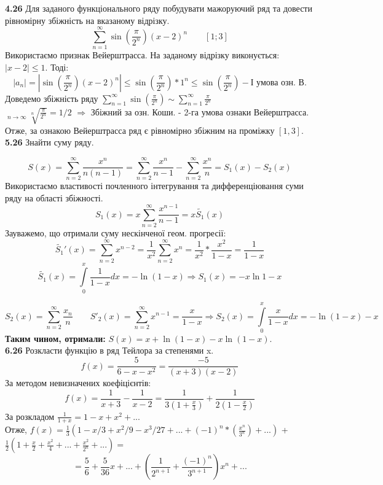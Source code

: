 \documentclass[14pt,a4paper]{scrartcl}
\theoremstyle{definition}
\theoremstyle{remark}
\theoremstyle{definition}
\theoremstyle{definition}
\DeclareMathOperator*\uplim{\overline{lim}}
\begin{document}
\textbf{4.26} Для заданого функціонального ряду побудувати мажоруючий ряд
та довести рівномірну збіжність на вказаному відрізку.\\
$$  \sum\limits_{ n = 1}^{ \infty}{\sin{( \frac{\pi}{2^n} )}(x-2)^n } \qquad [1;3]$$
Використаємо признак Вейерштрасса. На заданому відрізку виконується: $ \left| x-2  \right| \leq 1 $. Тоді:\\
$$
\left| a_n \right| = \left| \sin{( \frac{\pi}{2^n} )} (x-2)^n  \right| \leq   \sin{( \frac{\pi}{ 2^n} )} * 1^n \leq \sin{( \frac{\pi}{2^n} )} - \text{І умова озн. В.}
$$
Доведемо збіжність ряду $  \sum\limits_{n = 1}^{ \infty}{ \sin{( \frac{\pi}{2^n} )} } \sim  \sum\limits_{n = 1}^{ \infty}{ \frac{\pi}{2^n} }$ \\
$  \uplim\limits_{n\to  \infty}{ \sqrt[n]{ \frac{\pi}{2^n} }} =  1/2 $ $\Rightarrow$ Збіжний за озн. Коши. - 2-га умова ознаки Вейерштрасса.\\
Отже, за ознакою Вейерштрасса ряд є рівномірно збіжним на проміжку $[1,3]$. \\

\textbf{5.26} Знайти суму ряду.

$$
S(x) =  \sum\limits_{n = 2}^{ \infty}{ \frac{x^n}{ n(n-1)} } =  \sum\limits_{n = 2}^{ \infty}{ \frac{x^n}{n-1} -  \sum\limits_{n = 2}^{ \infty}{ \frac{x^n}{n} } } = S_1(x) - S_2(x)
$$
Використаємо властивості почленного інтегрування та дифференціювання суми ряду на області збіжності.
$$
S_1(x) = x  \sum\limits_{n = 2}^{ \infty}{  \frac{x^{n-1}}{n-1} } = x \tilde{S_1}(x)
$$
Зауважемо, що отримали суму нескінченої геом. прогресії:
$$
\tilde{S_1}'(x) =  \sum\limits_{n = 2}^{ \infty}{x^{n-2}} = \frac{1}{x^2}  \sum\limits_{n = 2}^{ \infty}{x^n} = \frac{1}{x^2} * \frac{x^2}{1-x} = \frac{1}{1-x}
$$
$$
\tilde{S_1}(x) =  \int\limits_{0}^{x}{ \frac{1}{1-x}dx } = - \ln{(1-x)} \Rightarrow S_1(x) = -x \ln{1-x}
$$

$$
S_2(x) =  \sum\limits_{n = 2}^{ \infty}{ \frac{x_n}{n} } \qquad S'_2(x) =  \sum\limits_{n = 2}^{ \infty}{x^{n-1} } = \frac{x}{1-x} \Rightarrow S_2(x) =  \int\limits_{0}^{x}{ \frac{x}{1-x}dx }  = - \ln{(1-x)} - x
$$
\textbf{Таким чином, отримали:} $S(x)= x + \ln{(1-x)} - x \ln{(1-x)} $. \\

\textbf{6.26} Розкласти функцію в ряд Тейлора за степенями x.\\
$$
f(x) = \frac{5}{6-x-x^2} =  \frac{-5}{ (x+3)(x-2)}
$$
За методом невизначених коефіцієнтів:
$$
f(x) = \frac{1}{x+3} - \frac{1}{x-2} =  \frac{1}{3(1+ \frac{x}{3} )} + \frac{1}{2(1 - \frac{x}{2} )}
$$
За розкладом $\frac{1}{1+x} = 1- x +x^2 + ...$\\
Отже, $f(x) = \frac{1}{3} ( 1 - x/3 + x^2/9 - x^3/27 + ... + (-1)^n* ( \displaystyle\frac{x^n}{3^n}  )+...) $ + $ \frac{1}{2} (1 + \frac{x}{2} + \frac{x^2}{4} + ... + \displaystyle \frac{x^2}{2^n}  +... ) = $
$$= \frac{5}{6} + \frac{5}{36}x + ... + \left( \frac{1}{2^{n+1}} +  \frac{(-1)^n}{3^{n+1}}   \right)x^n+ ...    $$
\end{document}
